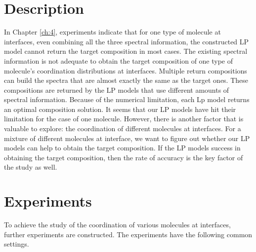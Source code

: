  \label{ch:5}
\section{Description}

In Chapter \ref{ch:4}, experiments indicate that for one type of molecule at interfaces, even combining all the three spectral information, the constructed LP model cannot return the target composition in most cases. The existing spectral information is not adequate to obtain the target composition of one type of molecule's coordination distributions at interfaces. Multiple return compositions can build the spectra that are almost exactly the same as the target ones. These compositions are returned by the LP models that use different amounts of spectral information. Because of the numerical limitation, each Lp model returns an optimal composition solution. It seems that our LP models have hit their limitation for the case of one molecule. However, there is another factor that is valuable to explore: the coordination of different molecules at interfaces. For a mixture of different molecules at interface, we want to figure out whether our LP models can help to obtain the target composition. If the LP models success in obtaining the target composition, then the rate of accuracy is the key factor of the study as well. \\


\section{Experiments}
To achieve the study of the coordination of various molecules at interfaces, further experiments are constructed. The experiments have the following common settings. \\

